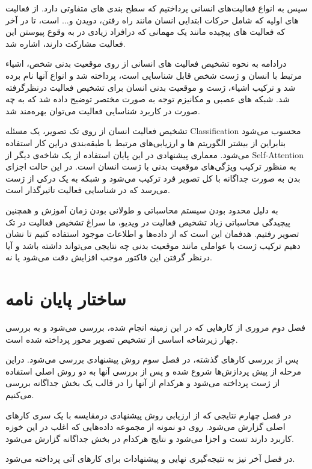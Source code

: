 سپس به انواع فعالیت‌های انسانی پرداختیم که سطح بندی های متفاوتی دارد. از فعالیت های اولیه که شامل حرکات ابتدایی انسان مانند راه رفتن،‌ دویدن و... است، تا در آخر که فعالیت های پیچیده مانند یک مهمانی که درافراد زیادی در به وقوع پیوستن این فعالیت مشارکت دارند، اشاره شد.

درادامه به نحوه تشخیص فعالیت های انسانی از روی موقعیت بدنی شخص، اشیاء مرتبط با انسان و ژست شخص قابل شناسایی است،‌ پرداخته شد و انواع آنها نام برده شد و ترکیب اشیاء، ژست و موقعیت بدنی انسان برای تشخیص فعالیت درنظرگرفته شد. شبکه های عصبی و مکانیزم توجه به صورت مختصر توضیح داده شد که به چه صورت در کاربرد شناسایی فعالیت می‌توان بهره‌مند شد.

تشخیص فعالیت انسان از روی تک تصویر،‌ یک مسئله %
\gls{Classification}
 محسوب می‌شود بنابراین از بیشتر الگوریتم ها و ارزیابی‌های مرتبط با طبقه‌بندی دراین کار استفاده می‌شود. معماری پیشنهادی در این پایان استفاده از یک شاخه‌ی دیگر از %
 \gls{Self-Attention}
  به منظور ترکیب ویژگی‌های موقعیت بدنی با ژست انسان است. در این حالت اجزای بدن به صورت جداگانه با کل تصویر فرد ترکیب می‌شود و شبکه به یک درکی از ژست می‌رسد که در شناسایی فعالیت تاثیرگذار است.
  
 به دلیل محدود بودن سیستم محاسباتی و طولانی بودن زمان آموزش و همچنین پیچیدگی محاسباتی زیاد تشخیص فعالیت در ویدیو،‌ ما سراغ تشخیص فعالیت در تک تصویر رفتیم. هدفمان این است که از داده‌ها و اطلاعات موجود استفاده کنیم تا نشان دهیم ترکیب ژست با عواملی مانند موقعیت بدنی چه نتایجی می‌تواند داشته باشد و آیا درنظر گرفتن این فاکتور موجب افزایش دقت می‌شود یا نه.

\section{ساختار پایان نامه} 

فصل دوم مروری از کارهایی که در این زمینه انجام شده، بررسی می‌شود و به بررسی چهار زیرشاخه اساسی از تشخیص تصویر محور پرداخته شده است.

پس از بررسی کارهای گذشته، در فصل سوم روش پیشنهادی بررسی می‌شود. دراین مرحله از پیش پردازش‌ها شروع شده و پس از بررسی آنها به دو روش اصلی استفاده از ژست پرداخته می‌شود و هرکدام از آنها را در قالب یک بخش جداگانه بررسی می‌کنیم.

در فصل چهارم نتایجی که از ارزیابی روش پیشنهادی درمقایسه با یک سری کارهای اصلی گزارش می‌شود. روی دو نمونه از مجموعه ‌داده‌هایی که اغلب در این خوزه کاربرد دارند تست و اجزا می‌شود و نتایج هرکدام در بخش جداگانه گزارش می‌شود.

در فصل آخر نیز به نتیجه‌گیری نهایی و پیشنهادات برای کارهای آتی پرداخته می‌شود.

